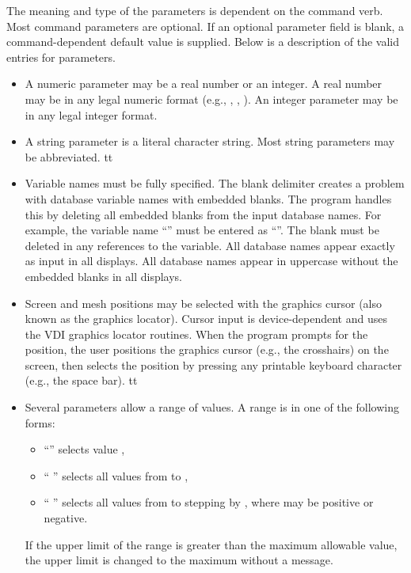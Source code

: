 The meaning and type of the parameters is dependent on the command verb.
Most command parameters are optional. If an optional parameter field is
blank, a command-dependent default value is supplied. Below is a
description of the valid entries for parameters.
\setlength{\itemsep}{\medskipamount} \begin{itemize}
%
\item
A numeric parameter may be a real number or an integer. A real number
may be in any legal  numeric format (e.g., ,
, ). An integer parameter may be in any legal
integer format.
\item
A string parameter is a literal character string. Most string parameters
may be abbreviated.
%
\newcommand{\okname}{f}
\ifx\PROGRAM\BLOT \renewcommand{\okname}{t} \fi
\ifx\PROGRAM\ALGEBRA \renewcommand{\okname}{t} \fi
\ifx\PROGRAM\GROPE \renewcommand{\okname}{t} \fi
\if\okname t
\item
Variable names must be fully specified. The blank delimiter creates a
problem with database variable names with embedded blanks. The program
handles this by deleting all embedded blanks from the input database
names. For example, the variable name ``'' must be entered as
``''. The blank must be deleted in any references to the
variable.
\ifx\PROGRAM\GROPE
All database names appear exactly as input in all displays.
\else
All database names appear in uppercase without the embedded blanks in
all displays.
\fi
\fi
\ifx\PROGRAM\BLOT
\item
Screen and mesh positions may be selected with the graphics cursor (also
known as the graphics locator). Cursor input is device-dependent and
uses the VDI graphics locator routines. When the program prompts for the
position, the user positions the graphics cursor (e.g., the crosshairs)
on the screen, then selects the position by pressing any printable
keyboard character (e.g., the space bar).
\fi
\newcommand{\okrange}{f}
\ifx\PROGRAM\BLOT \renewcommand{\okrange}{t} \fi
\ifx\PROGRAM\GROPE \renewcommand{\okrange}{t} \fi
\if\okrange t
\ifx\PROGRAM\GROPE \newpage \fi %
\item
Several parameters allow a range of values. A range is in one of the
following forms:
\setlength{\itemsep}{\medskipamount} \begin{itemize}
\item ``'' selects value ,
\item ``  '' selects all values from
 to ,
\item ``    ''
selects all values from  to  stepping by
, where  may be positive or negative.
\end{itemize}
If the upper limit of the range is greater than the maximum allowable
value, the upper limit is changed to the maximum without a message.
\fi
\end{itemize}

